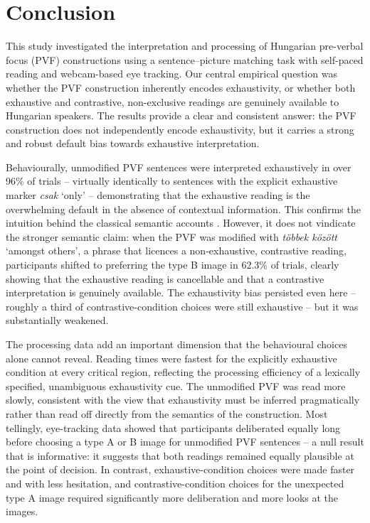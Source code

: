 \documentclass[a4paper, ruler]{CUP-JNL-LIN}%
\begin{document}
\section{Conclusion}
\label{sec:conclusion}

This study investigated the interpretation and processing of Hungarian pre-verbal focus (PVF) constructions using a sentence--picture matching task with self-paced reading and webcam-based eye tracking. Our central empirical question was whether the PVF construction inherently encodes exhaustivity, or whether both exhaustive and contrastive, non-exclusive readings are genuinely available to Hungarian speakers. The results provide a clear and consistent answer: the PVF construction does not independently encode exhaustivity, but it carries a strong and robust default bias towards exhaustive interpretation.

Behaviourally, unmodified PVF sentences were interpreted exhaustively in over 96\% of trials -- virtually identically to sentences with the explicit exhaustive marker \textit{csak} `only' -- demonstrating that the exhaustive reading is the overwhelming default in the absence of contextual information. This confirms the intuition behind the classical semantic accounts \citep{szabolcsi_1981_compositionality,ekiss_1998_identificational,kenesei_2006_focus}. However, it does not vindicate the stronger semantic claim: when the PVF was modified with \textit{többek között} `amongst others', a phrase that licences a non-exhaustive, contrastive reading, participants shifted to preferring the type B image in 62.3\% of trials, clearly showing that the exhaustive reading is cancellable and that a contrastive interpretation is genuinely available. The exhaustivity bias persisted even here -- roughly a third of contrastive-condition choices were still exhaustive -- but it was substantially weakened.

The processing data add an important dimension that the behavioural choices alone cannot reveal. Reading times were fastest for the explicitly exhaustive condition at every critical region, reflecting the processing efficiency of a lexically specified, unambiguous exhaustivity cue. The unmodified PVF was read more slowly, consistent with the view that exhaustivity must be inferred pragmatically rather than read off directly from the semantics of the construction. Most tellingly, eye-tracking data showed that participants deliberated equally long before choosing a type A or B image for unmodified PVF sentences -- a null result that is informative: it suggests that both readings remained equally plausible at the point of decision. In contrast, exhaustive-condition choices were made faster and with less hesitation, and contrastive-condition choices for the unexpected type A image required significantly more deliberation and more looks at the images.
\end{document}
